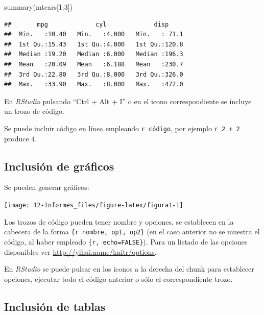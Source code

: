 \documentclass[
]{book}
\newenvironment{Shaded}{\begin{snugshade}}{\end{snugshade}}
\newcommand{\DecValTok}[1]{\textcolor[rgb]{0.00,0.00,0.81}{#1}}
\newcommand{\FunctionTok}[1]{\textcolor[rgb]{0.00,0.00,0.00}{#1}}
\newcommand{\NormalTok}[1]{#1}
\newcommand{\SpecialCharTok}[1]{\textcolor[rgb]{0.00,0.00,0.00}{#1}}
\theoremstyle{break}
\theoremstyle{nonumberplain}
\begin{document}
\begin{Shaded}
\begin{Highlighting}[]
\FunctionTok{summary}\NormalTok{(mtcars[}\DecValTok{1}\SpecialCharTok{:}\DecValTok{3}\NormalTok{])}
\end{Highlighting}
\end{Shaded}

\begin{verbatim}
##       mpg             cyl             disp      
##  Min.   :10.40   Min.   :4.000   Min.   : 71.1  
##  1st Qu.:15.43   1st Qu.:4.000   1st Qu.:120.8  
##  Median :19.20   Median :6.000   Median :196.3  
##  Mean   :20.09   Mean   :6.188   Mean   :230.7  
##  3rd Qu.:22.80   3rd Qu.:8.000   3rd Qu.:326.0  
##  Max.   :33.90   Max.   :8.000   Max.   :472.0
\end{verbatim}

En \emph{RStudio} pulsando ``Ctrl + Alt + I'' o en el icono correspondiente se incluye un trozo de código.

Se puede incluir código en línea empleando \texttt{\textasciigrave{}r\ código\textasciigrave{}},
por ejemplo \texttt{\textasciigrave{}r\ 2\ +\ 2\textasciigrave{}} produce 4.

\hypertarget{inclusiuxf3n-de-gruxe1ficos}{%
\subsection{Inclusión de gráficos}\label{inclusiuxf3n-de-gruxe1ficos}}

Se pueden generar gráficos:

\begin{center}\texttt{[image: 12-Informes\_files/figure-latex/figura1-1]} \end{center}

Los trozos de código pueden tener nombre y opciones, se establecen en la cabecera de la forma
\texttt{\textasciigrave{}\textasciigrave{}\textasciigrave{}\{r\ nombre,\ op1,\ op2\}}
(en el caso anterior no se muestra el código, al haber empleado \texttt{\textasciigrave{}\textasciigrave{}\textasciigrave{}\{r,\ echo=FALSE\}}).
Para un listado de las opciones disponibles ver \url{http://yihui.name/knitr/options}.

En \emph{RStudio} se puede pulsar en los iconos a la derecha del chunk para establecer opciones,
ejecutar todo el código anterior o sólo el correspondiente trozo.

\hypertarget{inclusiuxf3n-de-tablas}{%
\subsection{Inclusión de tablas}\label{inclusiuxf3n-de-tablas}}
\end{document}
